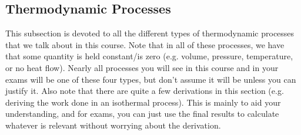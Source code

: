 \subsection{Thermodynamic Processes}
This subsection is devoted to all the different types of thermodynamic processes that we talk about in this course. Note that in all of these processes, we have that some quantity is held constant/is zero (e.g. volume, pressure, temperature, or no heat flow). Nearly all processes you will see in this course and in your exams will be one of these four types, but don't assume it will be unless you can justify it. Also note that there are quite a few derivations in this section (e.g. deriving the work done in an isothermal process). This is mainly to aid your understanding, and for exams, you can just use the final results to calculate whatever is relevant without worrying about the derivation. 



